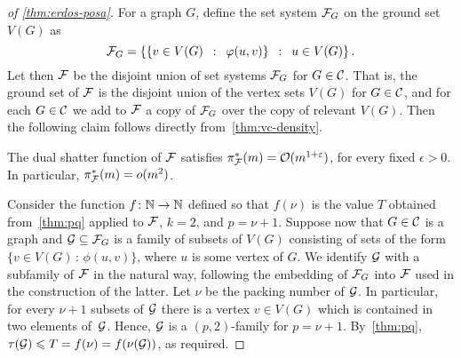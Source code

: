 \begin{proof}[of \cref{thm:erdos-posa}]
For a graph $G$, define the set system ${\cal F}_G$ on the ground set $V(G)$ as
$${\cal F}_G = \left\{\left\{v\in V(G) \,~:~\, \varphi(u, v) \right\} \,~:~\, u\in V(G) \right\}.$$
Let then $\cal F$ be the disjoint union of set systems ${\cal F}_G$ for $G\in \mathcal{C}$. That is, 
the ground set of $\cal F$ is the disjoint union of the vertex sets $V(G)$ for $G\in \mathcal{C}$, and for each $G\in \mathcal{C}$ we add to ${\cal F}$
a copy of ${\cal F}_G$ over the copy of relevant $V(G)$.
Then the following claim follows directly from~\cref{thm:vc-density}.

\begin{claim}
The dual shatter function of $\cal F$ satisfies $\pi^*_{\cal F}(m)=\mathcal{O}(m^{1+\varepsilon})$,
for every fixed $\epsilon>0$. In particular, $\pi^*_{\cal F}(m)=o(m^{2})$.
\end{claim}

Consider the function $f\colon \mathbb{N} \to \mathbb{N}$ defined so that $f(\nu)$ is the value $T$ obtained from~\cref{thm:pq} applied to $\cal F$, $k=2$, and $p=\nu+1$.
Suppose now that $G\in \mathcal{C}$ is a graph and $\mathcal{G}\subseteq \mathcal{F}_G$
is a family of subsets of $V(G)$ consisting of sets of the form $\{v\in V(G)\,\colon\,\phi(u,v)\}$, where $u$ is some vertex of $G$.
We identify $\mathcal{G}$ with a subfamily of $\mathcal{F}$ in the natural way, following the embedding of $\mathcal{F}_G$ into $\mathcal{F}$ used in the construction of the latter.
Let $\nu$ be the packing number of $\mathcal{G}$.
In particular, for every $\nu+1$ subsets of $\mathcal{G}$
there is a vertex $v\in V(G)$
which is contained in two elements of~$\mathcal{G}$.
Hence, $\mathcal{G}$ is a $(p,2)$-family for $p=\nu+1$.
By~\cref{thm:pq}, $\tau(\mathcal{G})\leqslant T=f(\nu)=f(\nu(\mathcal{G}))$, as required.
\end{proof}

